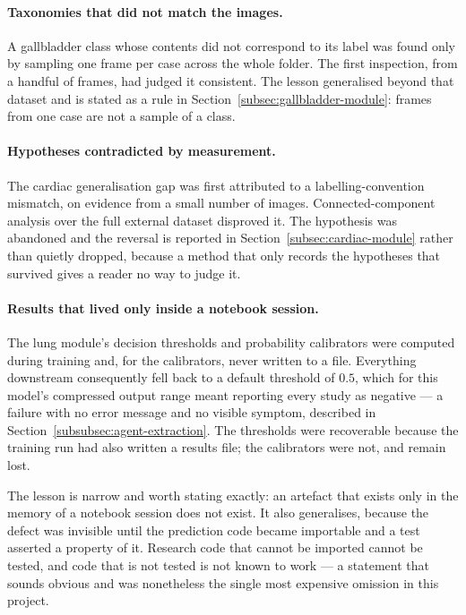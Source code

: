 \paragraph{Taxonomies that did not match the images.} A gallbladder class whose contents did not
correspond to its label was found only by sampling one frame per case across the whole folder.
The first inspection, from a handful of frames, had judged it consistent. The lesson generalised
beyond that dataset and is stated as a rule in Section~\ref{subsec:gallbladder-module}: frames
from one case are not a sample of a class.

\paragraph{Hypotheses contradicted by measurement.} The cardiac generalisation gap was first
attributed to a labelling-convention mismatch, on evidence from a small number of images.
Connected-component analysis over the full external dataset disproved it. The hypothesis was
abandoned and the reversal is reported in Section~\ref{subsec:cardiac-module} rather than
quietly dropped, because a method that only records the hypotheses that survived gives a reader
no way to judge it.

\paragraph{Results that lived only inside a notebook session.} The lung module's decision
thresholds and probability calibrators were computed during training and, for the calibrators,
never written to a file. Everything downstream consequently fell back to a default threshold of
$0.5$, which for this model's compressed output range meant reporting every study as negative
--- a failure with no error message and no visible symptom, described in
Section~\ref{subsubsec:agent-extraction}. The thresholds were recoverable because the training
run had also written a results file; the calibrators were not, and remain lost.

The lesson is narrow and worth stating exactly: an artefact that exists only in the memory of a
notebook session does not exist. It also generalises, because the defect was invisible until the
prediction code became importable and a test asserted a property of it. Research code that
cannot be imported cannot be tested, and code that is not tested is not known to work --- a
statement that sounds obvious and was nonetheless the single most expensive omission in this
project.

